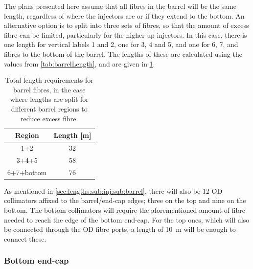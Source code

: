 \documentclass[a4paper,11pt]{article}
\begin{document}
The plans presented here assume that all fibres in the barrel will be the same length, regardless of where the injectors are or if they extend to the bottom. An alternative option is to split into three sets of fibres, so that the amount of excess fibre can be limited, particularly for the higher up injectors. In this case, there is one length for vertical labels 1 and 2, one for 3, 4 and 5, and one for 6, 7, and fibres to the bottom of the barrel. The lengths of these are calculated using the values from \cref{tab:barrelLength}, and are given in \cref{tab:barrelLengthSplit}.
\begin{table}[h!]
\centering
\begin{tabular}{cc}\toprule
Region		&		Length [m]		\\ \midrule
1+2			&		32	\\
3+4+5		&		58	\\
6+7+bottom	&		76	\\ \bottomrule
\end{tabular}
\caption{Total length requirements for barrel fibres, in the case where lengths are split for different barrel regions to reduce excess fibre.}\label{tab:barrelLengthSplit}
\end{table}

As mentioned in \cref{sec:lengths:sub:inj:sub:barrel}, there will also be 12 OD collimators affixed to the barrel/end-cap edges; three on the top and nine on the bottom. The bottom collimators will require the aforementioned amount of fibre needed to reach the edge of the bottom end-cap. For the top ones, which will also be connected through the OD fibre ports, a length of 10~m will be enough to connect these.

\subsubsection{Bottom end-cap}\label{sec:lengths:sub:len:sub:bottom}
\end{document}
